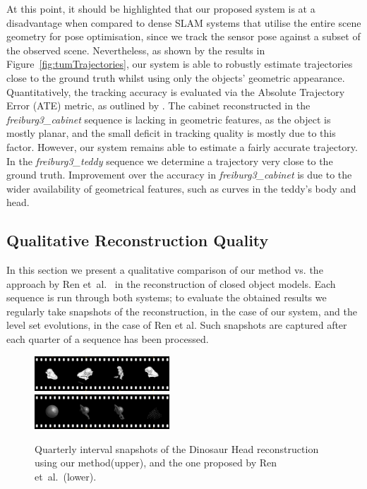 At this point, it should be highlighted that our proposed system is at a disadvantage when compared to dense SLAM systems that utilise the entire scene geometry for pose optimisation, since we track the sensor pose against a subset of the observed scene.
Nevertheless, as shown by the results in Figure~\ref{fig:tumTrajectories}, our system is able to robustly estimate trajectories close to the ground truth whilst using only the objects' geometric appearance.
Quantitatively, the tracking accuracy is evaluated via the Absolute Trajectory Error (ATE) metric, as outlined by \cite{sturm12iros}.
The cabinet reconstructed in the \textit{freiburg3\_cabinet} sequence is lacking in geometric features, as the object is mostly planar,
and the small deficit in tracking quality is mostly due to this factor.
However, our system remains able to estimate a fairly accurate trajectory. 
In the \textit{freiburg3\_teddy} sequence we determine a trajectory very close to the ground truth.
Improvement over the accuracy in \textit{freiburg3\_cabinet} is due to the wider availability of geometrical features, such as curves in the teddy's body and head.

\subsection{Qualitative Reconstruction Quality}
In this section we present a qualitative comparison of our method vs. the approach by Ren et~al.~\cite{Ren2013} in the reconstruction of closed object models. %
Each sequence is run through both systems; to evaluate the obtained results we regularly take snapshots of the reconstruction, in the case of our system, and the level set evolutions, in the case of Ren et al.
Such snapshots are captured after each quarter of a sequence has been processed. %

\begin{figure}[!t]
	\centering
		\includegraphics[width=0.45\textwidth]{filmstrips/dino.png} \\
		\vspace{0.5mm}
		\includegraphics[width=0.45\textwidth]{filmstrips/dino_s3d_large.png}
	\caption{
        Quarterly interval snapshots of the Dinosaur Head reconstruction using our method(upper), and the one proposed by Ren et~al.~\cite{Ren2013}(lower).
	}
	\label{fig:dinoComparison}
\end{figure}

